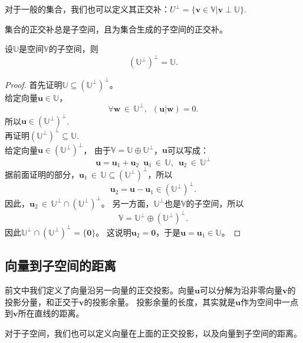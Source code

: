 \documentclass[12pt,UTF8]{ctexbook}
\begin{document}
对于一般的集合，我们也可以定义其正交补：$U^{\perp} = \{\mathbf{v} \in \mathbb{V} | \mathbf{v} \perp \mathbb{U}\}$.

集合的正交补总是子空间，且为集合生成的子空间的正交补。
\begin{pp}\label{pp:7_7_1}
    设$\mathbb{U}$是空间$\mathbb{V}$的子空间，则
    $$\left(\mathbb{U}^\perp\right)^\perp = \mathbb{U}.$$
\end{pp}
\begin{proof} %
    首先证明$\mathbb{U}\subseteq \left(\mathbb{U}^\perp\right)^\perp$。\\
    给定向量$\mathbf{u} \in \mathbb{U}$，
    $$\forall \mathbf{w} \, \in \, \mathbb{U}^\perp, \,\,\, (\mathbf{u} | \mathbf{w}) = 0.$$
    所以$\mathbf{u} \in \left(\mathbb{U}^\perp\right)^\perp$.\\
    再证明$\left(\mathbb{U}^\perp\right)^\perp \subseteq \mathbb{U}.$\\
    给定向量$\mathbf{u} \in \left(\mathbb{U}^\perp\right)^\perp$，
    由于$\mathbb{V} = \mathbb{U} \oplus \mathbb{U}^\perp$，$\mathbf{u}$可以写成：
    $$ \mathbf{u} = \mathbf{u}_1 + \mathbf{u}_2 \,\,\, \mathbf{u}_1 \,\in \, \mathbb{U}, \,\,\, \mathbf{u}_2 \,\in \, \mathbb{U}^\perp$$
    据前面证明的部分，$\mathbf{u}_1 \,\in \, \mathbb{U} \subseteq \left(\mathbb{U}^\perp\right)^\perp$，所以
    $$ \mathbf{u}_2 = \mathbf{u} - \mathbf{u}_1 \in \left(\mathbb{U}^\perp\right)^\perp.$$
    因此，$\mathbf{u}_2 \,\in \, \mathbb{U}^\perp \cap \left(\mathbb{U}^\perp\right)^\perp$。
    另一方面，$\mathbb{U}^\perp$也是$\mathbb{V}$的子空间，所以
    $$ \mathbb{V} = \mathbb{U}^\perp \oplus \left(\mathbb{U}^\perp\right)^\perp.$$
    因此$\mathbb{U}^\perp \cap \left(\mathbb{U}^\perp\right)^\perp = \{\mathbf{0}\}$。
    这说明$\mathbf{u}_2 = \mathbf{0}$，于是$\mathbf{u} = \mathbf{u}_1 \in  \mathbb{U}$。

\end{proof}


\subsection{向量到子空间的距离}
前文中我们定义了向量沿另一向量的正交投影。向量$\mathbf{u}$可以分解为沿非零向量$\mathbf{v}$的投影分量，和正交于$\mathbf{v}$的投影余量。
投影余量的长度，其实就是$\mathbf{u}$作为空间中一点到$\mathbf{v}$所在直线的距离。

对于子空间，我们也可以定义向量在上面的正交投影，以及向量到子空间的距离。
\end{document}
